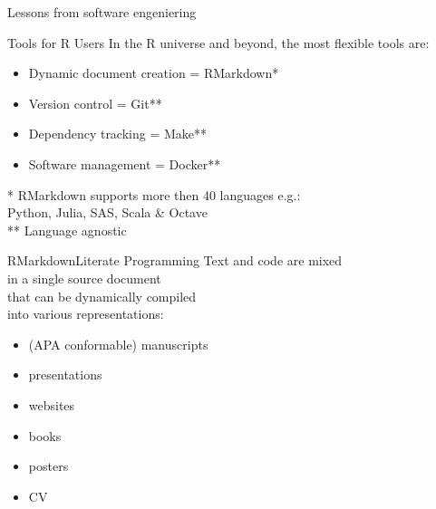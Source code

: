 \documentclass[12pt,t]{beamer}
\begin{document}
{\begin{frame}[c]{Lessons from software engeniering}
\end{frame}

\begin{frame}[c]{Tools for R Users}
	In the R universe and beyond, the most flexible tools are:
  \begin{itemize}
    \item Dynamic document creation = RMarkdown*
    \item Version control = Git**
    \item Dependency tracking = Make**
    \item Software management = Docker**
  \end{itemize}
  \vfill
  \textcolor{lolit}{
	* RMarkdown supports more then 40 languages e.g.:\\
	\hspace{10mm}Python, Julia, SAS, Scala \& Octave\\
	** Language agnostic
	}
\end{frame}

\begin{frame}[c]{RMarkdown\textemdash{}Literate Programming}
  Text and code are mixed\\
  in a single source document\\
  that can be \textcolor{hilit}{dynamically} compiled\\
  into various representations:
  \begin{itemize}
    \item (APA conformable) manuscripts
    \item presentations
    \item websites
    \item books
    \item posters
		\item CV
  \end{itemize}
\end{frame}

}
\end{document}
